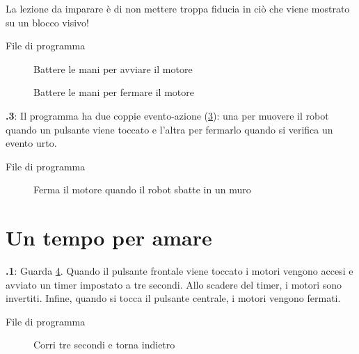 \documentclass[12pt,a4paper,italian]{article}
\begin{document}
La lezione da imparare è di non mettere
troppa fiducia in ciò che viene mostrato su un blocco visivo!

{\raggedleft \hfill File di programma }

\begin{figure}
\begin{center}
\caption{Battere le mani per avviare il motore}\label{fig.clap-to-start}
\end{center}
\end{figure}

\begin{figure}[hbt]
\begin{center}
\caption{Battere le mani per fermare il motore}\label{fig.clap-to-stop}
\end{center}
\end{figure}

\textbf{\thesection.3}:
Il programma ha due coppie evento-azione (\cref{fig.bump}): una per
muovere il robot quando un pulsante viene toccato e l'altra per fermarlo quando si verifica un
evento urto.

{\raggedleft \hfill File di programma }

\begin{figure}[hbt]
\begin{center}
\caption{Ferma il motore quando il robot sbatte in un muro}\label{fig.bump}
\end{center}
\end{figure}


\section{Un tempo per amare}

\textbf{\thesection.1}:
Guarda \cref{fig.three}. 
Quando il pulsante frontale
viene toccato i motori vengono accesi e avviato un timer impostato a tre secondi.
Allo scadere del timer, i motori sono invertiti. Infine, quando  si tocca il
pulsante centrale, i motori vengono fermati.

{\raggedleft \hfill File di programma }


\begin{figure}[hbt]
\begin{center}
\caption{Corri tre secondi e torna indietro}\label{fig.three}
\end{center}
\end{figure}
\end{document}
